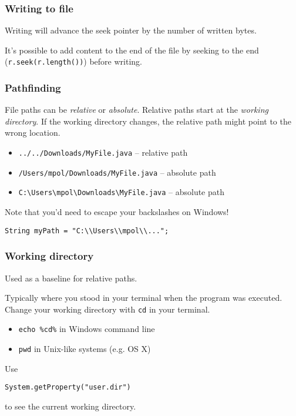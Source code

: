 \documentclass{beamer}
\begin{document}
	\begin{frame}
		\frametitle{Writing to file}
		

		Writing will advance the seek pointer by the number of written bytes.

		It's possible to add content to the end of the file by seeking to the end (\texttt{r.seek(r.length())}) before writing.
	\end{frame}

	\begin{frame}[fragile]
		\frametitle{Pathfinding}
	
		File paths can be \emph{relative} or \emph{absolute}. Relative paths start at the \emph{working directory}. If the working directory changes, the relative path might point to the wrong location.

		\pause

		\begin{itemize}
			\item \texttt{../../Downloads/MyFile.java} -- relative path
			\item \texttt{/Users/mpol/Downloads/MyFile.java} -- absolute path
			\item \texttt{C:\textbackslash Users\textbackslash mpol\textbackslash Downloads\textbackslash MyFile.java} -- absolute path
		\end{itemize}

		Note that you'd need to escape your backslashes on Windows!

		\begin{lstlisting}[style=customjava]
		String myPath = "C:\\Users\\mpol\\...";\end{lstlisting}
	\end{frame}

	\begin{frame}[fragile]
		\frametitle{Working directory}
		Used as a baseline for relative paths.
		
		Typically where you stood in your terminal when the program was executed. Change your working directory with \texttt{cd} in your terminal.
		
		\begin{itemize}
			\item \texttt{echo \%cd\%} in Windows command line
			\item \texttt{pwd} in Unix-like systems (e.g. OS X)
		\end{itemize}

		Use
\begin{lstlisting}[style=customjava]
System.getProperty("user.dir")\end{lstlisting}
\vspace{-0.5cm}
to see the current working directory.
	\end{frame}
\end{document}
